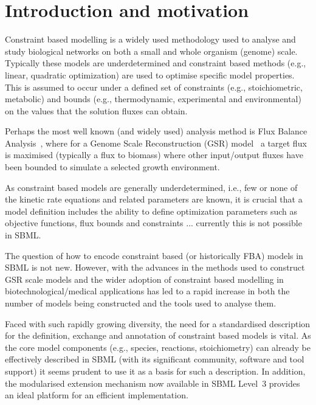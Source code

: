 
\section{ Introduction and motivation }
\label{intro}

Constraint based modelling is a widely used methodology used to analyse and
study biological networks on both a small and whole organism (genome)
scale. Typically these models are underdetermined and constraint based
methods (e.g., linear, quadratic optimization) are used to optimise
specific model properties. This is assumed to occur under a defined set of
constraints (e.g., stoichiometric, metabolic) and bounds (e.g.,
thermodynamic, experimental and environmental) on the values that the
solution fluxes can obtain.

Perhaps the most well known (and widely used) analysis method is Flux
Balance Analysis~\citep[FBA; ][]{orth_2010}, where for a Genome Scale
Reconstruction (GSR) model~\citep{oberhardt_2009} a target flux is
maximised (typically a flux to biomass) where other input/output fluxes
have been bounded to simulate a selected growth environment.

As constraint based models are generally underdetermined, i.e., few or none
of the kinetic rate equations and related parameters are known, it is
crucial that a model definition includes the ability to define optimization
parameters such as objective functions, flux bounds and constraints
... currently this is not possible in SBML.

The question of how to encode constraint based (or historically FBA) models
in SBML is not new. However, with the advances in the methods used to
construct GSR scale models and the wider adoption of constraint based
modelling in biotechnological/medical applications has led to a rapid
increase in both the number of models being constructed and the tools used
to analyse them.

Faced with such rapidly growing diversity, the need for a standardised
description for the definition, exchange and annotation of constraint
based models is vital. As the core model components (e.g., species,
reactions, stoichiometry) can already be effectively described in SBML
(with its significant community, software and tool support) it seems
prudent to use it as a basis for such a description. In addition, the
modularised extension mechanism now available in SBML Level~3 provides
an ideal platform for an efficient implementation.
